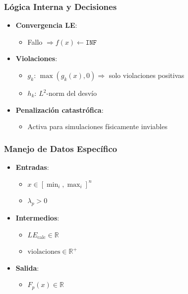 \subsubsection{Lógica Interna y Decisiones}
\begin{itemize}
    \item \textbf{Convergencia LE}:
    \begin{itemize}
        \item Fallo $\Rightarrow f(x) \leftarrow \texttt{INF}$
    \end{itemize}

    \item \textbf{Violaciones}:
    \begin{itemize}
        \item $g_k$: $\max(g_k(x), 0) \Rightarrow$ solo violaciones positivas
        \item $h_k$: $L^2$-norm del desvío
    \end{itemize}

    \item \textbf{Penalización catastrófica}:
    \begin{itemize}
        \item Activa para simulaciones físicamente inviables
    \end{itemize}
\end{itemize}

\subsubsection{Manejo de Datos Específico}
\begin{itemize}
    \item \textbf{Entradas}:
    \begin{itemize}
        \item $x \in {[\min_i, \max_i]}^n$
        \item $\lambda_p > 0$
    \end{itemize}

    \item \textbf{Intermedios}:
    \begin{itemize}
        \item $LE_{\text{calc}} \in \mathbb{R}$
        \item $\text{violaciones} \in \mathbb{R}^+$
    \end{itemize}

    \item \textbf{Salida}:
    \begin{itemize}
        \item $F_p(x) \in \mathbb{R}$
    \end{itemize}
\end{itemize}

